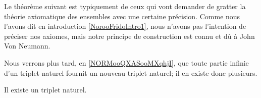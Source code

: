\begin{normaltext}	\label{NORMooTripletNaturelGratterTheoEns}
	Le théorème suivant est typiquement de ceux qui vont demander de gratter la théorie axiomatique des ensembles avec une certaine précision. Comme nous l'avons dit en introduction \ref{NorooFridoIntro1}, nous n'avons pas l'intention de préciser nos axiomes, mais notre principe de construction est connu et dû à John Von Neumann.

	Nous verrons plus tard, en \ref{NORMooQXASooMXqhjI}, que toute partie infinie d'un triplet naturel fournit un nouveau triplet naturel; il en existe donc plusieurs.
\end{normaltext}

\begin{theorem}     \label{THOooOXMHooXYgMqb}
	Il existe un triplet naturel.
\end{theorem}

